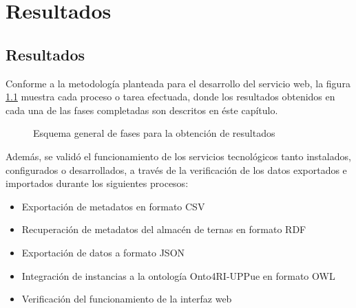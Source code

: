\renewcommand{\chaptername}{Capitulo}
\chapter{Resultados} 
\section{Resultados}

Conforme a la metodolog\'ia planteada para el desarrollo del servicio web, la figura \ref{esquemaResultados} muestra cada proceso o tarea efectuada, donde los resultados obtenidos en cada una de las fases completadas son descritos en \'este cap\'itulo.

\begin{figure}[!ht]
	\centering
    \caption{Esquema general de fases para la obtenci\'on de resultados}
    \label{esquemaResultados}
\end{figure}

Adem\'as, se valid\'o el funcionamiento de los servicios tecnol\'ogicos tanto instalados, configurados o desarrollados, a trav\'es de la verificaci\'on de los datos exportados e importados durante los siguientes procesos:

\begin{itemize}
    \item Exportaci\'on de metadatos en formato CSV
    \item Recuperaci\'on de metadatos del almac\'en de ternas en formato RDF
    \item Exportaci\'on de datos a formato JSON
    \item Integraci\'on de instancias a la ontolog\'ia Onto4RI-UPPue en formato OWL
    \item Verificaci\'on del funcionamiento de la interfaz web
\end{itemize}

